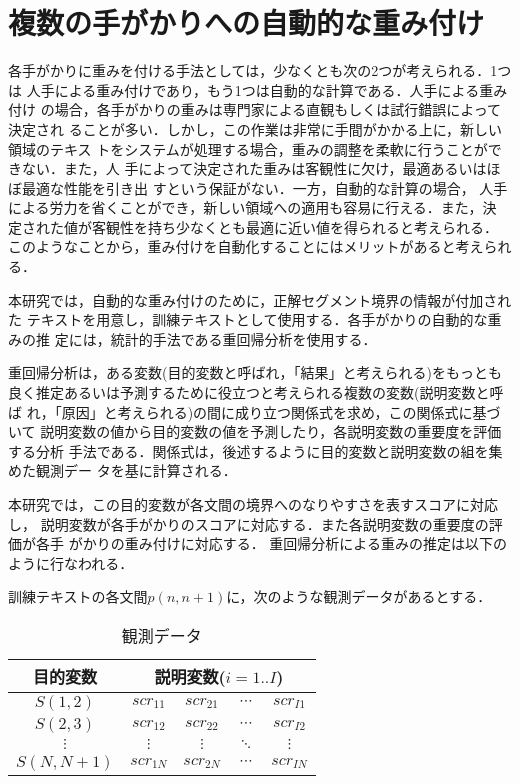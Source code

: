 \newpage
\section{複数の手がかりへの自動的な重み付け}\label{sec:weight}

各手がかりに重みを付ける手法としては，少なくとも次の2つが考えられる．1つは
人手による重み付けであり，もう1つは自動的な計算である．人手による重み付け
の場合，各手がかりの重みは専門家による直観もしくは試行錯誤によって決定され
ることが多い．しかし，この作業は非常に手間がかかる上に，新しい領域のテキス
トをシステムが処理する場合，重みの調整を柔軟に行うことができない．また，人
手によって決定された重みは客観性に欠け，最適あるいはほぼ最適な性能を引き出
すという保証がない\cite{Alshawi:94,Rayner:94}．一方，自動的な計算の場合，
人手による労力を省くことができ，新しい領域への適用も容易に行える．また，決
定された値が客観性を持ち少なくとも最適に近い値を得られると考えられる．
このようなことから，重み付けを自動化することにはメリットがあると考えられる．

本研究では，自動的な重み付けのために，正解セグメント境界の情報が付加された
テキストを用意し，訓練テキストとして使用する．各手がかりの自動的な重みの推
定には，統計的手法である重回帰分析\cite{Sen:90:a,Jobson:91}を使用する．

重回帰分析は，ある変数(目的変数と呼ばれ，「結果」と考えられる)をもっとも
良く推定あるいは予測するために役立つと考えられる複数の変数(説明変数と呼ば
れ，「原因」と考えられる)の間に成り立つ関係式を求め，この関係式に基づいて
説明変数の値から目的変数の値を予測したり，各説明変数の重要度を評価する分析
手法である．関係式は，後述するように目的変数と説明変数の組を集めた観測デー
タを基に計算される．

本研究では，この目的変数が各文間の境界へのなりやすさを表すスコアに対応し，
説明変数が各手がかりのスコアに対応する．また各説明変数の重要度の評価が各手
がかりの重み付けに対応する．
重回帰分析による重みの推定は以下のように行なわれる．

訓練テキストの各文間$p(n,n+1)$に，次のような観測データがあるとする．

\begin{table}[htbp]
\begin{center}
\caption{観測データ}\label{equ:kansoku}
\begin{tabular}{|c|c|c|c|c|}\hline
目的変数 & \multicolumn{4}{|c|}{説明変数($i=1..I$)}\\\hline
$S(1,2)$ & $scr_{11}$ & $scr_{21}$ &$\cdots$ & $scr_{I1}$\\
$S(2,3)$ & $scr_{12}$ & $scr_{22}$ & $\cdots$ & $scr_{I2}$\\
$\vdots$ & $\vdots$   & $\vdots$   & $\ddots$ & $\vdots$  \\
$S(N,N+1)$& $scr_{1N}$ & $scr_{2N}$& $\cdots$ & $scr_{IN}$\\\hline
\end{tabular}
\end{center}
\end{table}

